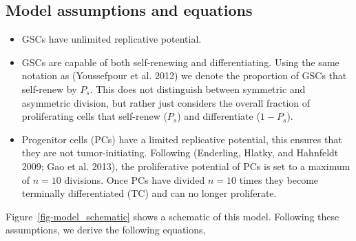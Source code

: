\documentclass[
  default,
]{sn-jnl}
\begin{document}
\subsection{Model assumptions and
equations}\label{sec-model-assumptions}

\begin{itemize}
\item
  GSCs have unlimited replicative potential.
\item
  GSCs are capable of both self-renewing and differentiating. Using the
  same notation as (Youssefpour et al. 2012) we denote the proportion of
  GSCs that self-renew by \(P_s\). This does not distinguish between
  symmetric and asymmetric division, but rather just considers the
  overall fraction of proliferating cells that self-renew (\(P_s\)) and
  differentiate (\(1 - P_s\)).
\item
  Progenitor cells (PCs) have a limited replicative potential, this
  ensures that they are not tumor-initiating. Following (Enderling,
  Hlatky, and Hahnfeldt 2009; Gao et al. 2013), the proliferative
  potential of PCs is set to a maximum of \(n = 10\) divisions. Once PCs
  have divided \(n=10\) times they become terminally differentiated (TC)
  and can no longer proliferate.
\end{itemize}

Figure~\ref{fig-model_schematic} shows a schematic of this model.
Following these assumptions, we derive the following equations,
\end{document}
